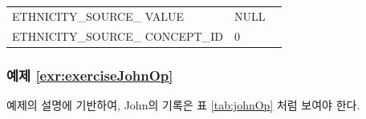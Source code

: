 \documentclass[10.5pt]{book}
\theoremstyle{definition}
\theoremstyle{definition}
\theoremstyle{definition}
\theoremstyle{remark}
\begin{document}
\begin{longtable}[]{@{}lll@{}}
\begin{minipage}[t]{0.28\columnwidth}
ETHNICITY\_SOURCE\_ VALUE\strut
\end{minipage} & \begin{minipage}[t]{0.16\columnwidth}\raggedright\strut
NULL\strut
\end{minipage} & \begin{minipage}[t]{0.48\columnwidth}\raggedright\strut
\strut
\end{minipage}\tabularnewline
\begin{minipage}[t]{0.28\columnwidth}\raggedright\strut
ETHNICITY\_SOURCE\_ CONCEPT\_ID\strut
\end{minipage} & \begin{minipage}[t]{0.16\columnwidth}\raggedright\strut
0\strut
\end{minipage} & \begin{minipage}[t]{0.48\columnwidth}\raggedright\strut
\strut
\end{minipage}\tabularnewline
\bottomrule
\end{longtable}

\subsubsection*{예제
\ref{exr:exerciseJohnOp}}\label{-refexrexercisejohnop}

예제의 설명에 기반하여, John의 기록은 표 \ref{tab:johnOp} 처럼 보여야
한다.
\end{document}
